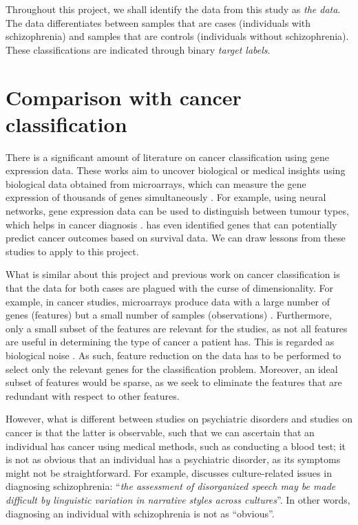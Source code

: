 \documentclass[12pt, twoside, a4paper]{report}
\begin{document}
Throughout this project, we shall identify the data from this study as \textit{the data}. The data differentiates between samples that are cases (individuals with schizophrenia) and samples that are controls (individuals without schizophrenia). These classifications are indicated through binary \textit{target labels}.


\section{Comparison with cancer classification} \label{bg:cancer}

There is a significant amount of literature on cancer classification using gene expression data. These works aim to uncover biological or medical insights using biological data obtained from microarrays, which can measure the gene expression of thousands of genes simultaneously \citep{RefWorks:79}. For example, using neural networks, gene expression data can be used to distinguish between tumour types, which helps in cancer diagnosis \citep{RefWorks:80, RefWorks:88}. \cite{RefWorks:199} has even identified genes that can potentially predict cancer outcomes based on survival data. We can draw lessons from these studies to apply to this project.

What is similar about this project and previous work on cancer classification is that the data for both cases are plagued with the curse of dimensionality. For example, in cancer studies, microarrays produce data with a large number of genes (features) but a small number of samples (observations) \cite{RefWorks:88}. Furthermore, only a small subset of the features are relevant for the studies, as not all features are useful in determining the type of cancer a patient has. This is regarded as biological noise \cite{RefWorks:89}. As such, feature reduction on the data has to be performed to select only the relevant genes for the classification problem. Moreover, an ideal subset of features would be sparse, as we seek to eliminate the features that are redundant with respect to other features.

However, what is different between studies on psychiatric disorders and studies on cancer is that the latter is observable, such that we can ascertain that an individual has cancer using medical methods, such as conducting a blood test; it is not as obvious that an individual has a psychiatric disorder, as its symptoms might not be straightforward. For example, \cite{RefWorks:114} discusses culture-related issues in diagnosing schizophrenia: ``\textit{the assessment of disorganized speech may be made difficult by linguistic variation in narrative styles across cultures}''. In other words, diagnosing an individual with schizophrenia is not as ``obvious''.
\end{document}
